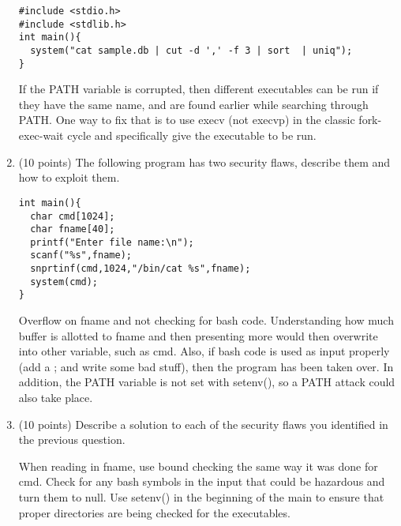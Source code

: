 \documentclass{article}[9pt]
\newenvironment{myanswer}{\begin{mdframed}\begin{answerfont}}{\end{answerfont}\end{mdframed}}
\begin{document}
\begin{enumerate}
\begin{lstlisting}
#include <stdio.h>
#include <stdlib.h>
int main(){
  system("cat sample.db | cut -d ',' -f 3 | sort  | uniq");
}

\end{lstlisting}


\begin{myanswer}
If the PATH variable is corrupted, then different executables can be run
if they have the same name, and are found earlier while searching
through PATH. One way to fix that is to use execv (not execvp) in the
classic fork-exec-wait cycle and specifically give the executable to be run.
\end{myanswer}

\item 
(10 points) The following program has two security flaws, describe them
and how to exploit them.



\begin{lstlisting}
int main(){                                 
  char cmd[1024];
  char fname[40];
  printf("Enter file name:\n");
  scanf("%s",fname);
  snprtinf(cmd,1024,"/bin/cat %s",fname);
  system(cmd);
}

\end{lstlisting}


\begin{myanswer}
Overflow on fname and not checking for bash code. Understanding how much
buffer is allotted to fname and then presenting more would then
overwrite into other variable, such as cmd.  Also, if bash code is used
as input properly (add a ; and write some bad stuff), then the program
has been taken over.  In addition, the PATH variable is not set with
setenv(), so a PATH attack could also take place.  
\end{myanswer}

\item (10 points) Describe a solution to each of the security flaws you
identified in the previous question.
\begin{myanswer}
When reading in fname, use bound checking the same way it was done for
cmd. Check for any bash symbols in the input that could be hazardous and
turn them to null.  Use setenv() in the beginning of the main to ensure
that proper directories are being checked for the executables.
\end{myanswer}


\end{enumerate}
\end{document}
